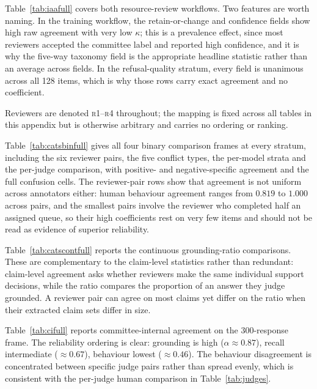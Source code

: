

\FloatBarrier

Table~\ref{tab:iaafull} covers both resource-review workflows. Two features are
worth naming. In the training workflow, the retain-or-change and confidence
fields show high raw agreement with very low $\kappa$; this is a prevalence
effect, since most reviewers accepted the committee label and reported high
confidence, and it is why the five-way taxonomy field is the appropriate headline
statistic rather than an average across fields. In the refusal-quality stratum,
every field is unanimous across all 128 items, which is why those rows carry
exact agreement and no coefficient.

Reviewers are denoted \textsc{r1}--\textsc{r4} throughout; the mapping is fixed
across all tables in this appendix but is otherwise arbitrary and carries no
ordering or ranking.



\FloatBarrier

Table~\ref{tab:catsbinfull} gives all four binary comparison frames at every
stratum, including the six reviewer pairs, the five conflict types, the per-model
strata and the per-judge comparison, with positive- and negative-specific
agreement and the full confusion cells. The reviewer-pair rows show that
agreement is not uniform across annotators either: human behaviour agreement
ranges from $0.819$ to $1.000$ across pairs, and the smallest pairs involve the
reviewer who completed half an assigned queue, so their high coefficients rest on
very few items and should not be read as evidence of superior reliability.



\FloatBarrier

Table~\ref{tab:catscontfull} reports the continuous grounding-ratio comparisons.
These are complementary to the claim-level statistics rather than redundant:
claim-level agreement asks whether reviewers make the same individual support
decisions, while the ratio compares the proportion of an answer they judge
grounded. A reviewer pair can agree on most claims yet differ on the ratio when
their extracted claim sets differ in size.



\FloatBarrier

Table~\ref{tab:cifull} reports committee-internal agreement on the
300-response frame. The reliability ordering is clear: grounding is high
($\alpha \approx 0.87$), recall intermediate ($\approx 0.67$), behaviour lowest
($\approx 0.46$). The behaviour disagreement is concentrated between specific
judge pairs rather than spread evenly, which is consistent with the per-judge
human comparison in Table~\ref{tab:judges}.

